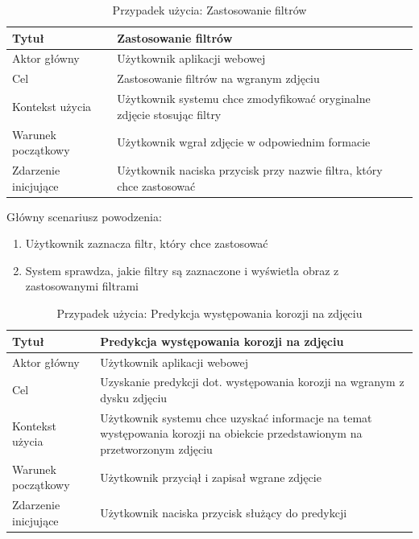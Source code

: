 \documentclass[polish,12pt]{aghthesis}
\begin{document}
\begin{table}[h!]
\centering
 \begin{tabular}{|m{4cm}|m{11cm}|} 
 \hline
 Tytuł & Zastosowanie filtrów\\
 \hline
 Aktor główny & Użytkownik aplikacji webowej\\
 \hline
 Cel & Zastosowanie filtrów na wgranym zdjęciu\\ 
 \hline
 Kontekst użycia & Użytkownik systemu chce zmodyfikować oryginalne zdjęcie stosując filtry\\ 
 \hline
 Warunek początkowy & Użytkownik wgrał zdjęcie w odpowiednim formacie\\
 \hline
 Zdarzenie inicjujące & Użytkownik naciska przycisk przy nazwie filtra, który chce zastosować\\
 \hline
\end{tabular}
\caption{Przypadek użycia: Zastosowanie filtrów}
\label{table:4}
\end{table}

\noindent
Główny scenariusz powodzenia:
\begin{enumerate}
    \item Użytkownik zaznacza filtr, który chce zastosować
    \item System sprawdza, jakie filtry są zaznaczone i wyświetla obraz z zastosowanymi filtrami
\end{enumerate}

\FloatBarrier\clearpage
\begin{table}[h!]
\centering
 \begin{tabular}{|m{4cm}|m{11cm}|} 
 \hline
 Tytuł & Predykcja występowania korozji na zdjęciu\\
 \hline
 Aktor główny & Użytkownik aplikacji webowej\\
 \hline
 Cel & Uzyskanie predykcji dot. występowania korozji na wgranym z dysku zdjęciu\\ 
 \hline
 Kontekst użycia & Użytkownik systemu chce uzyskać informacje na temat występowania korozji na obiekcie przedstawionym na przetworzonym zdjęciu\\ 
 \hline
 Warunek początkowy & Użytkownik przyciął i zapisał wgrane zdjęcie\\
 \hline
 Zdarzenie inicjujące & Użytkownik naciska przycisk służący do predykcji\\
 \hline
\end{tabular}
\caption{Przypadek użycia: Predykcja występowania korozji na zdjęciu}
\label{table:5}
\end{table}
\end{document}
